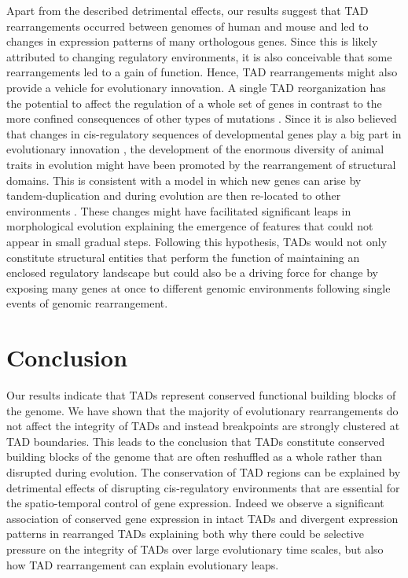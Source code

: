 \documentclass[a4paper,twoside=true,openright,parskip=full,chapterprefix=true,11pt,headings=normal,bibliography=totoc,listof=totoc,titlepage=on,captions=tableabove,draft=false]{scrreprt}
\theoremstyle{definition}
\theoremstyle{definition}
\theoremstyle{definition}
\theoremstyle{remark}
\begin{document}
Apart from the described detrimental effects, our results suggest that
TAD rearrangements occurred between genomes of human and mouse and led
to changes in expression patterns of many orthologous genes. Since this
is likely attributed to changing regulatory environments, it is also
conceivable that some rearrangements led to a gain of function. Hence,
TAD rearrangements might also provide a vehicle for evolutionary
innovation. A single TAD reorganization has the potential to affect the
regulation of a whole set of genes in contrast to the more confined
consequences of other types of mutations \citep{Acemel2017}. Since it is
also believed that changes in cis-regulatory sequences of developmental
genes play a big part in evolutionary innovation \citep{Carroll2008},
the development of the enormous diversity of animal traits in evolution
might have been promoted by the rearrangement of structural domains.
This is consistent with a model in which new genes can arise by
tandem-duplication and during evolution are then re-located to other
environments \citep{Ibn-Salem2017}. These changes might have facilitated
significant leaps in morphological evolution explaining the emergence of
features that could not appear in small gradual steps. Following this
hypothesis, TADs would not only constitute structural entities that
perform the function of maintaining an enclosed regulatory landscape but
could also be a driving force for change by exposing many genes at once
to different genomic environments following single events of genomic
rearrangement.

\section{Conclusion}\label{conclusion-1}

Our results indicate that TADs represent conserved functional building
blocks of the genome. We have shown that the majority of evolutionary
rearrangements do not affect the integrity of TADs and instead
breakpoints are strongly clustered at TAD boundaries. This leads to the
conclusion that TADs constitute conserved building blocks of the genome
that are often reshuffled as a whole rather than disrupted during
evolution. The conservation of TAD regions can be explained by
detrimental effects of disrupting cis-regulatory environments that are
essential for the spatio-temporal control of gene expression. Indeed we
observe a significant association of conserved gene expression in intact
TADs and divergent expression patterns in rearranged TADs explaining
both why there could be selective pressure on the integrity of TADs over
large evolutionary time scales, but also how TAD rearrangement can
explain evolutionary leaps.
\end{document}
